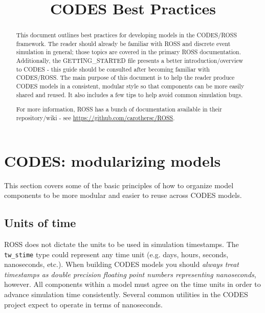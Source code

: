 \documentclass[conference,10pt,compsocconf,onecolumn]{IEEEtran}
\begin{document}
\title{CODES Best Practices}





\renewcommand{\thetable}{\arabic{table}}

\maketitle

\begin{abstract}
This document outlines best practices for developing models in the
CODES/ROSS framework.  The reader should already be familiar with ROSS
and discrete event simulation in general; those topics are covered in the primary
ROSS documentation. Additionally, the GETTING\_STARTED file presents a better
introduction/overview to CODES - this guide should be consulted after becoming
familiar with CODES/ROSS.
%
The main purpose of this document is to help the reader produce
CODES models in a consistent, modular style so that components can be more
easily shared and reused.  It also includes a few tips to help avoid common
simulation bugs.

For more information, ROSS has a bunch of documentation available in their
repository/wiki - see \url{https://github.com/carothersc/ROSS}.
\end{abstract}

\section{CODES: modularizing models}

This section covers some of the basic principles of how to organize model
components to be more modular and easier to reuse across CODES models.

\subsection{Units of time}

ROSS does not dictate the units to be used in simulation timestamps.
The \texttt{tw\_stime} type could represent any time unit
(e.g. days, hours, seconds, nanoseconds, etc.).  When building CODES
models you should \emph{always treat timestamps as double precision floating
point numbers representing nanoseconds}, however.
All components within a model must agree on the time units in order to
advance simulation time consistently.  Several common utilities in the
CODES project expect to operate in terms of nanoseconds.
\end{document}
